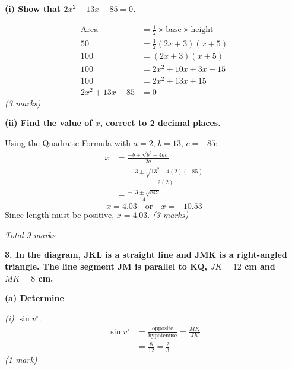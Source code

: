 \documentclass[12pt,a4paper]{article}
\newcommand{\qhead}[1]{\vspace{0.6em}\noindent\textbf{\large #1}\par\vspace{0.3em}}
\newcommand{\subhead}[1]{\vspace{0.3em}\noindent\textbf{#1}\par}
\newcommand{\qmarks}[1]{\hfill\textit{(#1)}}
\begin{document}
\subhead{(i) Show that $2x^2 + 13x - 85 = 0$.}
\begin{align*}
\text{Area} &= \tfrac{1}{2}\times \text{base}\times\text{height} \\
50 &= \tfrac{1}{2}(2x+3)(x+5) \\
100 &= (2x+3)(x+5) \\
100 &= 2x^2 + 10x + 3x + 15 \\
100 &= 2x^2 + 13x + 15 \\
2x^2 + 13x - 85 &= 0
\end{align*}
\qmarks{3 marks}

\subhead{(ii) Find the value of $x$, correct to 2 decimal places.}

Using the Quadratic Formula with $a = 2$, $b = 13$, $c = -85$:
\begin{align*}
x &= \frac{-b \pm \sqrt{b^2 - 4ac}}{2a} \\
&= \frac{-13 \pm \sqrt{13^2 - 4(2)(-85)}}{2(2)} \\
&= \frac{-13 \pm \sqrt{849}}{4}
\end{align*}
\[ x = 4.03 \quad \text{or} \quad x = -10.53 \]
Since length must be positive, $x = 4.03$.
\qmarks{3 marks}

\hfill\textit{Total 9 marks}

\newpage
\qhead{3. In the diagram, JKL is a straight line and JMK is a right-angled triangle. The line segment JM is parallel to KQ, $JK = 12$ cm and $MK = 8$ cm.}

\begin{center}
\end{center}

\subhead{(a) Determine}

\textit{(i) $\sin v^{\circ}$.}
\begin{align*}
\sin v^{\circ} &= \frac{\text{opposite}}{\text{hypotenuse}} = \frac{MK}{JK} \\
&= \frac{8}{12} = \frac{2}{3}
\end{align*}
\qmarks{1 mark}
\end{document}
